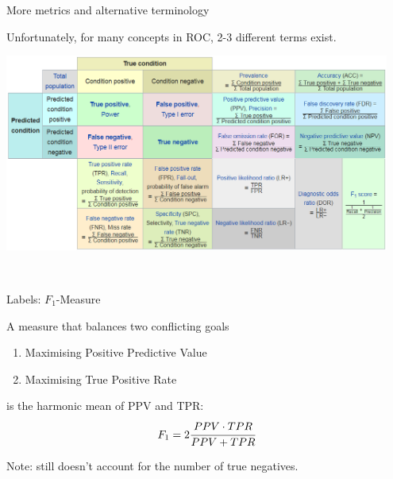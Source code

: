\documentclass[11pt,compress,t,notes=noshow, xcolor=table]{beamer}
\begin{document}
\begin{vbframe}{More metrics and alternative terminology}

Unfortunately, for many concepts in ROC, 2-3 different terms exist.

\begin{center}
\includegraphics[width=0.95\textwidth]{figure_man/roc-confmatrix-allterms.png}
\end{center}
\href{https://en.wikipedia.org/wiki/F1_score#Diagnostic_testing}{} $\phantom{blablabla}$
\href{https://upload.wikimedia.org/wikipedia/commons/0/0e/DiagnosticTesting_Diagram.svg}{}
\end{vbframe}


\begin{vbframe}{Labels: $F_1$-Measure}


\lz
A measure that balances two conflicting goals\\[.5em]
\begin{enumerate}
 \item Maximising Positive Predictive Value
 \item Maximising True Positive Rate\\[.5em]
\end{enumerate}
is the harmonic mean of PPV and TPR:
$$F_1 = 2 \cfrac{PPV \cdot TPR}{PPV + TPR}$$

\lz \lz
Note: still doesn’t account for the number of true negatives.
\end{vbframe}
\end{document}
